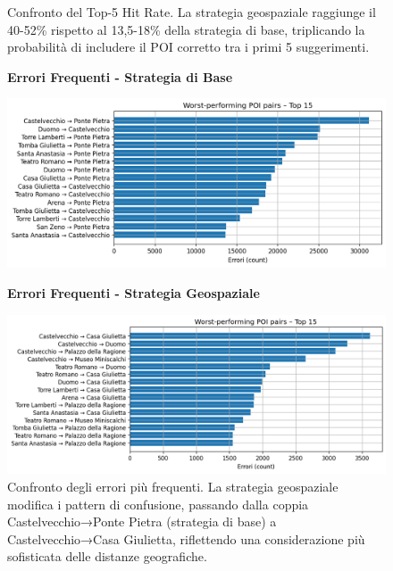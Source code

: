 \begin{itemize}
\begin{figure}[htbp]
\begin{minipage}{0.48\textwidth}
\end{minipage}
\caption{Confronto del Top-5 Hit Rate. La strategia geospaziale raggiunge il 40-52\% rispetto al 13,5-18\% della strategia di base, triplicando la probabilità di includere il POI corretto tra i primi 5 suggerimenti.}
\label{fig:top5_comparison}
\end{figure}

\begin{figure}[htbp]
\centering
\begin{minipage}{0.48\textwidth}
\centering
\textbf{Errori Frequenti - Strategia di Base}\par
\vspace{0.3em}
\includegraphics[width=\textwidth]{../../img/llama3.1_8b/no_SPACE-GEO_n-1_come_current_POI/worst_performing_pairs.png}
\end{minipage}
\hfill
\begin{minipage}{0.48\textwidth}
\centering
\textbf{Errori Frequenti - Strategia Geospaziale}\par
\vspace{0.3em}
\includegraphics[width=\textwidth]{../../img/llama3.1_8b/SPACE-GEO_n-1_come_current_POI/Worst_performing_POI_pairs.png}
\end{minipage}
\caption{Confronto degli errori più frequenti. La strategia geospaziale modifica i pattern di confusione, passando dalla coppia Castelvecchio→Ponte Pietra (strategia di base) a Castelvecchio→Casa Giulietta, riflettendo una considerazione più sofisticata delle distanze geografiche.}
\label{fig:errors_comparison}
\end{figure}


\end{itemize}

